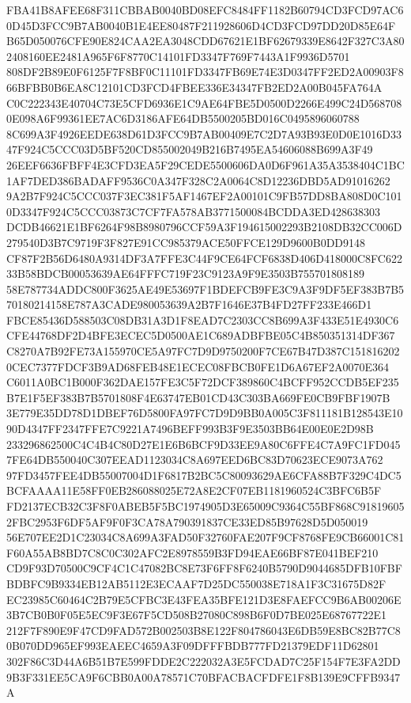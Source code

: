\documentclass[UTF8,fontset=fandol,zihao=-4,a4paper]{ctexart}
\begin{document}
{{FBA41B8AFEE68F311CBBAB0040BD08EFC8484FF1182B60794CD3FCD97AC60D45D3FCC9B7AB0040B1E4EE80487F211928606D4CD3FCD97DD20D85E64F
B65D050076CFE90E824CAA2EA3048CDD67621E1BF62679339E8642F327C3A802408160EE2481A965F6F8770C14101FD3347F769F7443A1F9936D5701
808DF2B89E0F6125F7F8BF0C11101FD3347FB69E74E3D0347FF2ED2A00903F866BFBB0B6EA8C12101CD3FCD4FBEE336E34347FB2ED2A00B045FA764A
C0C222343E40704C73E5CFD6936E1C9AE64FBE5D0500D2266E499C24D5687080E098A6F99361EE7AC6D3186AFE64DB5500205BD016C0495896060788
8C699A3F4926EEDE638D61D3FCC9B7AB00409E7C2D7A93B93E0D0E1016D3347F924C5CCC03D5BF520CD855002049B216B7495EA54606088B699A3F49
26EEF6636FBFF4E3CFD3EA5F29CEDE5500606DA0D6F961A35A3538404C1BC1AF7DED386BADAFF9536C0A347F328C2A0064C8D12236DBD5AD91016262
9A2B7F924C5CCC037F3EC381F5AF1467EF2A00101C9FB57DD8BA808D0C1010D3347F924C5CCC03873C7CF7FA578AB3771500084BCDDA3ED428638303
DCDB46621E1BF6264F98B8980796CCF59A3F194615002293B2108DB32CC006D279540D3B7C9719F3F827E91CC985379ACE50FFCE129D9600B0DD9148
CF87F2B56D6480A9314DF3A7FFE3C44F9CE64FCF6838D406D418000C8FC62233B58BDCB00053639AE64FFFC719F23C9123A9F9E3503B755701808189
58E787734ADDC800F3625AE49E53697F1BDEFCB9FE3C9A3F9DF5EF383B7B570180214158E787A3CADE980053639A2B7F1646E37B4FD27FF233E466D1
FBCE85436D588503C08DB31A3D1F8EAD7C2303CC8B699A3F433E51E4930C6CFE44768DF2D4BFE3ECEC5D0500AE1C689ADBFBE05C4B850351314DF367
C8270A7B92FE73A155970CE5A97FC7D9D9750200F7CE67B47D387C1518162020CEC7377FDCF3B9AD68FEB48E1ECEC08FBCB0FE1D6A67EF2A0070E364
C6011A0BC1B000F362DAE157FE3C5F72DCF389860C4BCFF952CCDB5EF235B7E1F5EF383B7B5701808F4E63747EB01CD43C303BA669FE0CB9FBF1907B
3E779E35DD78D1DBEF76D5800FA97FC7D9D9BB0A005C3F811181B128543E1090D4347FF2347FFE7C9221A7496BEFF993B3F9E3503BB64E00E0E2D98B
233296862500C4C4B4C80D27E1E6B6BCF9D33EE9A80C6FFE4C7A9FC1FD0457FE64DB550040C307EEAD1123034C8A697EED6BC83D70623ECE9073A762
97FD3457FEE4DB55007004D1F6817B2BC5C80093629AE6CFA88B7F329C4DC5BCFAAAA11E58FF0EB286088025E72A8E2CF07EB1181960524C3BFC6B5F
FD2137ECB32C3F8F0ABEB5F5BC1974905D3E65009C9364C55BF868C918196052FBC2953F6DF5AF9F0F3CA78A790391837CE33ED85B97628D5D050019
56E707EE2D1C23034C8A699A3FAD50F32760FAE207F9CF8768FE9CB66001C81F60A55AB8BD7C8C0C302AFC2E8978559B3FD94EAE66BF87E041BEF210
CD9F93D70500C9CF4C1C47082BC8E73F6FF8F6240B5790D9044685DFB10FBFBDBFC9B9334EB12AB5112E3ECAAF7D25DC550038E718A1F3C31675D82F
EC23985C60464C2B79E5CFBC3E43FEA35BFE121D3E8FAEFCC9B6AB00206E3B7CB0B0F05E5EC9F3E67F5CD508B27080C898B6F0D7BE025E68767722E1
212F7F890E9F47CD9FAD572B002503B8E122F804786043E6DB59E8BC82B77C80B070DD965EF993EAEEC4659A3F09DFFFBDB777FD21379EDF11D62801
302F86C3D44A6B51B7E599FDDE2C222032A3E5FCDAD7C25F154F7E3FA2DD9B3F331EE5CA9F6CBB0A00A78571C70BFACBACFDFE1F8B139E9CFFB9347A
}}
\end{document}
